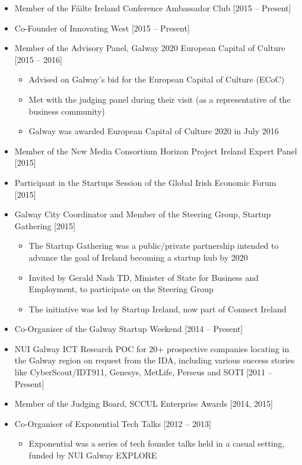 \documentclass[10pt,a4paper]{res} %
\begin{document}
\begin{resume}
\begin{itemize}
\begin{itemize}
\end{itemize}
\item Member of the F\'{a}ilte Ireland Conference Ambassador Club [2015 -- Present]
\item Co-Founder of Innovating West [2015 -- Present]
\item Member of the Advisory Panel, Galway 2020 European Capital of Culture [2015 -- 2016]
\begin{itemize} \itemsep -2pt
\item Advised on Galway's bid for the European Capital of Culture (ECoC)
\item Met with the judging panel during their visit (as a representative of the business community)
\item Galway was awarded European Capital of Culture 2020 in July 2016
\end{itemize}
\item Member of the New Media Consortium Horizon Project Ireland Expert Panel [2015]
\item Participant in the Startups Session of the Global Irish Economic Forum [2015]
\item Galway City Coordinator and Member of the Steering Group, Startup Gathering [2015]
\begin{itemize} \itemsep -2pt
\item The Startup Gathering was a public/private partnership intended to advance the goal of Ireland becoming a startup hub by 2020
\item Invited by Gerald Nash TD, Minister of State for Business and Employment, to participate on the Steering Group
\item The initiative was led by Startup Ireland, now part of Connect Ireland
\end{itemize}
\item Co-Organiser of the Galway Startup Weekend [2014 -- Present]
\item NUI Galway ICT Research POC for 20+ prospective companies locating in the Galway region on request from the IDA, including various success stories like CyberScout/IDT911, Genesys, MetLife, Perseus and SOTI [2011 -- Present]
\item Member of the Judging Board, SCCUL Enterprise Awards [2014, 2015]
\item Co-Organiser of Exponential Tech Talks [2012 -- 2013]
\begin{itemize} \itemsep -2pt
\item Exponential was a series of tech founder talks held in a casual setting, funded by NUI Galway EXPLORE

\end{itemize}
\end{itemize}
\end{resume}
\end{document}

